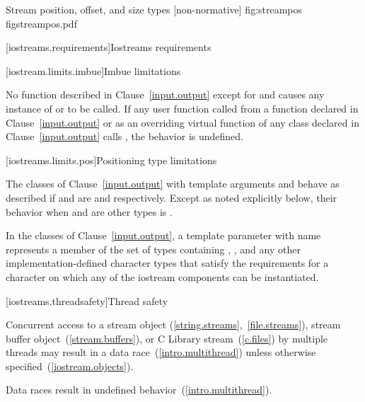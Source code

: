 \begin{importgraphic}
{Stream position, offset, and size types [non-normative]}
{fig:streampos}
{figstreampos.pdf}
\end{importgraphic}

[iostreams.requirements]{Iostreams requirements}

[iostream.limits.imbue]{Imbue limitations}

\pnum
No function described in Clause~\ref{input.output} except for
and 
causes any instance of
or
to be called.
If any user function called from a function declared in Clause~\ref{input.output} or
as an overriding virtual function of any class declared in Clause~\ref{input.output}
calls
,
the behavior is undefined.

[iostreams.limits.pos]{Positioning type limitations}

\pnum
The classes of Clause~\ref{input.output} with template arguments
and
behave as described if
and
are
and
respectively.
Except as noted explicitly below, their behavior when
and
are other types is
%
.

\pnum
In the classes of Clause~\ref{input.output}, a template parameter with name
 represents a member of the set of types containing , ,
and any other implementation-defined character types that satisfy the requirements for
a character on which any of the iostream components can be instantiated.

[iostreams.threadsafety]{Thread safety}

\pnum
Concurrent access to a stream object (\ref{string.streams},~\ref{file.streams}), stream buffer
object~(\ref{stream.buffers}), or C Library stream~(\ref{c.files}) by multiple threads may result in
a data race~(\ref{intro.multithread}) unless otherwise specified~(\ref{iostream.objects}).
\begin{note} Data races result in undefined behavior~(\ref{intro.multithread}). \end{note}

